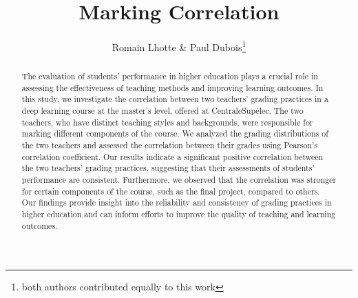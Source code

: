 \documentclass[a4paper]{article}
\title{Marking Correlation}
\author{Romain Lhotte \& Paul Dubois\footnote{both authors contributed equally to this work}}
\begin{document}
\maketitle

\begin{abstract}
	The evaluation of students' performance in higher education plays a crucial role in assessing the effectiveness of teaching methods and improving learning outcomes. In this study, we investigate the correlation between two teachers' grading practices in a deep learning course at the master's level, offered at CentraleSupélec. The two teachers, who have distinct teaching styles and backgrounds, were responsible for marking different components of the course. We analyzed the grading distributions of the two teachers and assessed the correlation between their grades using Pearson's correlation coefficient. Our results indicate a significant positive correlation between the two teachers' grading practices, suggesting that their assessments of students' performance are consistent. Furthermore, we observed that the correlation was stronger for certain components of the course, such as the final project, compared to others. Our findings provide insight into the reliability and consistency of grading practices in higher education and can inform efforts to improve the quality of teaching and learning outcomes.
\end{abstract}

\section{}
\end{document}
